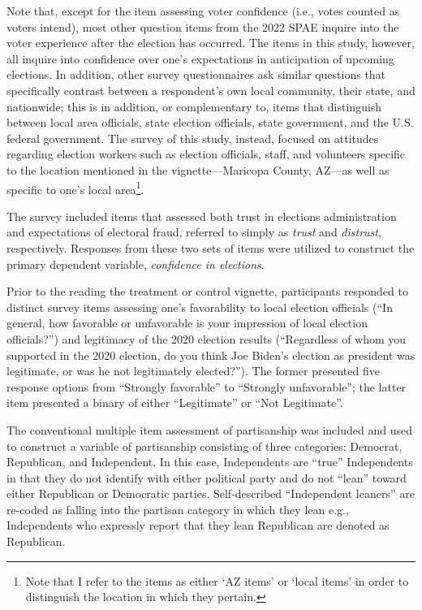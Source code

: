 \documentclass[
  12pt,
  letterpaper,
]{article}
\begin{document}
Note that, except for the item assessing voter confidence (i.e., votes
counted as voters intend), most other question items from the 2022 SPAE
inquire into the voter experience after the election has occurred. The
items in this study, however, all inquire into confidence over one's
expectations in anticipation of upcoming elections. In addition, other
survey questionnaires ask similar questions that specifically contrast
between a respondent's own local community, their state, and nationwide;
this is in addition, or complementary to, items that distinguish between
local area officials, state election officials, state government, and
the U.S. federal government. The survey of this study, instead, focused
on attitudes regarding election workers such as election officials,
staff, and volunteers specific to the location mentioned in the
vignette---Maricopa County, AZ---as well as specific to one's local
area\footnote{Note that I refer to the items as either `AZ items' or
  `local items' in order to distinguish the location in which they
  pertain.}.

The survey included items that assessed both trust in elections
administration and expectations of electoral fraud, referred to simply
as \emph{trust} and \emph{distrust}, respectively. Responses from these
two sets of items were utilized to construct the primary dependent
variable, \emph{confidence in elections}.

Prior to the reading the treatment or control vignette, participants
responded to distinct survey items assessing one's favorability to local
election officials (``In general, how favorable or unfavorable is your
impression of local election officials?'') and legitimacy of the 2020
election results (``Regardless of whom you supported in the 2020
election, do you think Joe Biden's election as president was legitimate,
or was he not legitimately elected?''). The former presented five
response options from ``Strongly favorable'' to ``Strongly
unfavorable''; the latter item presented a binary of either
``Legitimate'' or ``Not Legitimate''.

The conventional multiple item assessment of partisanship was included
and used to construct a variable of partisanship consisting of three
categories: Democrat, Republican, and Independent. In this case,
Independents are ``true'' Independents in that they do not identify with
either political party and do not ``lean'' toward either Republican or
Democratic parties. Self-described ``Independent leaners'' are re-coded
as falling into the partisan category in which they lean e.g.,
Independents who expressly report that they lean Republican are denoted
as Republican.
\end{document}
